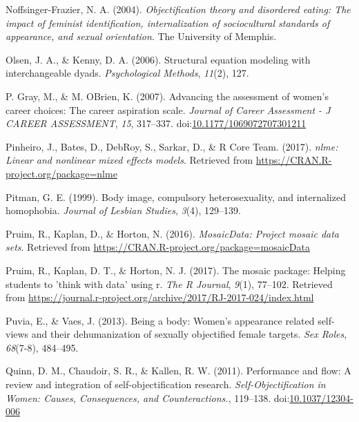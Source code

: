 \documentclass[
  man]{apa6}
\begin{document}
\leavevmode\hypertarget{ref-noffsinger2004objectification}{}%
Noffsinger-Frazier, N. A. (2004). \emph{Objectification theory and disordered eating: The impact of feminist identification, internalization of sociocultural standards of appearance, and sexual orientation}. The University of Memphis.

\leavevmode\hypertarget{ref-olsen2006structural}{}%
Olsen, J. A., \& Kenny, D. A. (2006). Structural equation modeling with interchangeable dyads. \emph{Psychological Methods}, \emph{11}(2), 127.

\leavevmode\hypertarget{ref-grayobrien2007}{}%
P. Gray, M., \& M. OBrien, K. (2007). Advancing the assessment of women's career choices: The career aspiration scale. \emph{Journal of Career Assessment - J CAREER ASSESSMENT}, \emph{15}, 317--337. doi:\href{https://doi.org/10.1177/1069072707301211}{10.1177/1069072707301211}

\leavevmode\hypertarget{ref-R-nlme}{}%
Pinheiro, J., Bates, D., DebRoy, S., Sarkar, D., \& R Core Team. (2017). \emph{nlme: Linear and nonlinear mixed effects models}. Retrieved from \url{https://CRAN.R-project.org/package=nlme}

\leavevmode\hypertarget{ref-pitman1999body}{}%
Pitman, G. E. (1999). Body image, compulsory heterosexuality, and internalized homophobia. \emph{Journal of Lesbian Studies}, \emph{3}(4), 129--139.

\leavevmode\hypertarget{ref-R-mosaicData}{}%
Pruim, R., Kaplan, D., \& Horton, N. (2016). \emph{MosaicData: Project mosaic data sets}. Retrieved from \url{https://CRAN.R-project.org/package=mosaicData}

\leavevmode\hypertarget{ref-R-mosaic}{}%
Pruim, R., Kaplan, D. T., \& Horton, N. J. (2017). The mosaic package: Helping students to 'think with data' using r. \emph{The R Journal}, \emph{9}(1), 77--102. Retrieved from \url{https://journal.r-project.org/archive/2017/RJ-2017-024/index.html}

\leavevmode\hypertarget{ref-puvia2013being}{}%
Puvia, E., \& Vaes, J. (2013). Being a body: Women's appearance related self-views and their dehumanization of sexually objectified female targets. \emph{Sex Roles}, \emph{68}(7-8), 484--495.

\leavevmode\hypertarget{ref-quinnetal}{}%
Quinn, D. M., Chaudoir, S. R., \& Kallen, R. W. (2011). Performance and flow: A review and integration of self-objectification research. \emph{Self-Objectification in Women: Causes, Consequences, and Counteractions.}, 119--138. doi:\href{https://doi.org/10.1037/12304-006}{10.1037/12304-006}
\end{document}
